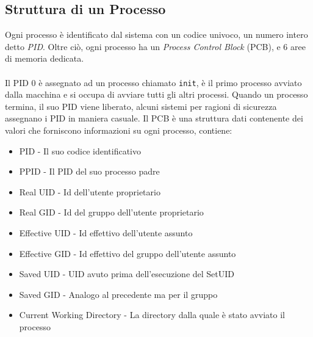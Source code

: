 \documentclass[12pt, letterpaper]{article}
\newcommand{\code}[1]{\colorbox{light-gray}{\texttt{#1}}}
\newcommand{\acc}{\\\hphantom{}\\}
\begin{document}
\subsection{Struttura di un Processo}
Ogni processo è identificato dal sistema con un codice 
univoco, un numero intero detto \textit{PID}. Oltre ciò, 
ogni processo ha un \textit{Process Control Block} (PCB), e 
6 aree di memoria dedicata.\acc 
Il PID 0 è assegnato ad un processo chiamato 
\code{init}, è il primo processo avviato dalla macchina e 
si occupa di avviare tutti gli altri processi. Quando un 
processo termina, il suo PID viene liberato, alcuni sistemi per 
ragioni di sicurezza assegnano i PID in maniera casuale.
Il PCB è una struttura dati contenente dei valori che forniscono 
informazioni su ogni processo, contiene: \begin{itemize}
    \item PID - Il suo codice identificativo 
    \item PPID - Il PID del suo processo padre
    \item Real UID - Id dell'utente proprietario 
    \item Real GID - Id del gruppo dell'utente proprietario 
    \item Effective UID - Id effettivo dell'utente assunto
    \item Effective GID - Id effettivo del gruppo dell'utente assunto
    \item Saved UID - UID avuto prima dell'esecuzione del SetUID
    \item Saved GID - Analogo al precedente ma per il gruppo 
    \item Current Working Directory - La directory dalla quale è stato avviato il processo
\end{itemize}
\end{document}
